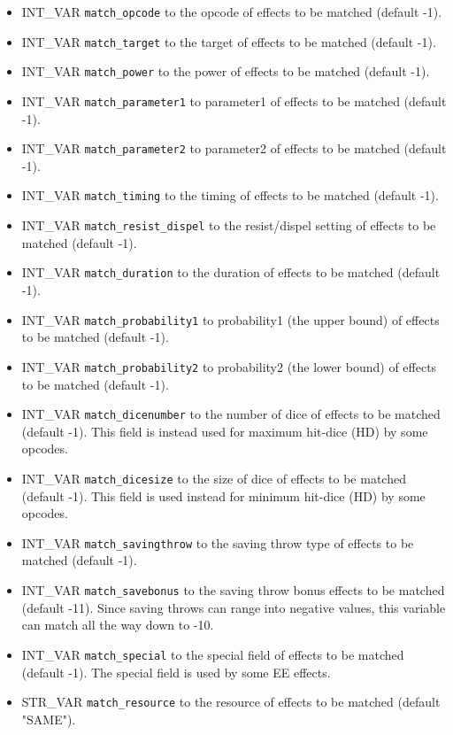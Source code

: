 \documentclass{article}
\begin{document}
\begin{itemize}
\item INT_VAR \verb+match_opcode+ to the opcode of effects to be matched (default -1).
\item INT_VAR \verb+match_target+ to the target of effects to be matched (default -1).
\item INT_VAR \verb+match_power+ to the power of effects to be matched (default -1).
\item INT_VAR \verb+match_parameter1+ to parameter1 of effects to be matched (default -1).
\item INT_VAR \verb+match_parameter2+ to parameter2 of effects to be matched (default -1).
\item INT_VAR \verb+match_timing+ to the timing of effects to be matched (default -1).
\item INT_VAR \verb+match_resist_dispel+ to the resist/dispel setting of effects to be matched (default -1).
\item INT_VAR \verb+match_duration+ to the duration of effects to be matched (default -1).
\item INT_VAR \verb+match_probability1+ to probability1 (the upper bound) of effects to be matched (default -1).
\item INT_VAR \verb+match_probability2+ to probability2 (the lower bound) of effects to be matched (default -1).
\item INT_VAR \verb+match_dicenumber+ to the number of dice of effects to be matched (default -1). This field is instead used for maximum hit-dice (HD) by some opcodes.
\item INT_VAR \verb+match_dicesize+ to the size of dice of effects to be matched (default -1). This field is used instead for minimum hit-dice (HD) by some opcodes.
\item INT_VAR \verb+match_savingthrow+ to the saving throw type of effects to be matched (default -1).
\item INT_VAR \verb+match_savebonus+ to the saving throw bonus effects to be matched (default -11). Since saving throws can range into negative values, this variable can match all the way down to -10.
\item INT_VAR \verb+match_special+  to the special field of effects to be matched (default -1). The special field is used by some EE effects.
\item STR_VAR \verb+match_resource+ to the resource of effects to be matched (default "SAME").
\end{itemize}
\end{document}
